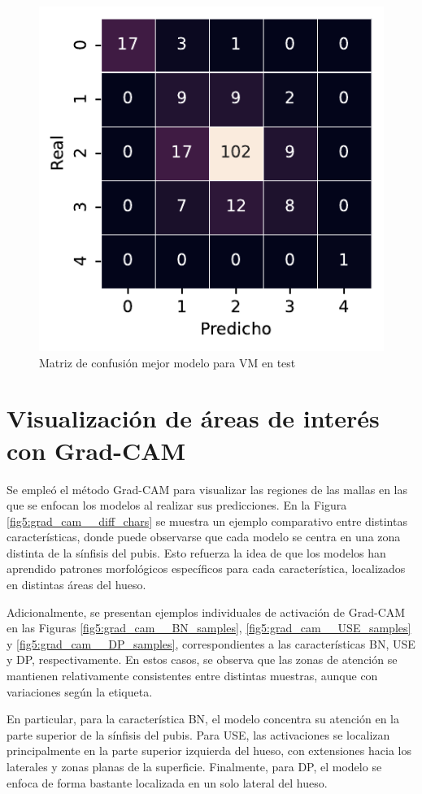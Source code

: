 \begin{figure}[htbp]
    \includegraphics[width=0.75\linewidth]{figures/5_experiments/single-vm-cm.pdf}
    \caption{Matriz de confusión mejor modelo para VM en test}
    \label{fig5:VM_confusion_matrix}
\end{figure}

\FloatBarrier

\section{Visualización de áreas de interés con Grad-CAM}

Se empleó el método Grad-CAM para visualizar las regiones de las mallas en las que se enfocan los modelos al realizar sus predicciones. En la Figura \ref{fig5:grad_cam__diff_chars} se muestra un ejemplo comparativo entre distintas características, donde puede observarse que cada modelo se centra en una zona distinta de la sínfisis del pubis. Esto refuerza la idea de que los modelos han aprendido patrones morfológicos específicos para cada característica, localizados en distintas áreas del hueso. 

Adicionalmente, se presentan ejemplos individuales de activación de Grad-CAM en las Figuras \ref{fig5:grad_cam__BN_samples}, \ref{fig5:grad_cam__USE_samples} y \ref{fig5:grad_cam__DP_samples}, correspondientes a las características BN, USE y DP, respectivamente. En estos casos, se observa que las zonas de atención se mantienen relativamente consistentes entre distintas muestras, aunque con variaciones según la etiqueta.

En particular, para la característica BN, el modelo concentra su atención en la parte superior de la sínfisis del pubis. Para USE, las activaciones se localizan principalmente en la parte superior izquierda del hueso, con extensiones hacia los laterales y zonas planas de la superficie. Finalmente, para DP, el modelo se enfoca de forma bastante localizada en un solo lateral del hueso.

